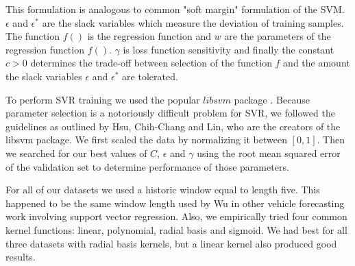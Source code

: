 This formulation  is analogous to common "soft margin" formulation of the SVM.   $\epsilon$ and $\epsilon^{*}$ are the slack variables which measure the deviation of training samples.  The function $f()$ is the regression function and $w$ are the parameters of the regression function $f()$.  $\gamma$ is loss function sensitivity and finally the constant $c > 0$ determines the trade-off between selection of the function $f$ and the amount the slack variables $\epsilon$ and $\epsilon^{*}$ are tolerated.  

To perform SVR training we used the popular $libsvm$ package \cite{Hsu2003}.  Because parameter selection is a notoriously difficult problem for SVR, we followed the guidelines as outlined by Hsu, Chih-Chang and Lin, who are the creators of the libsvm package.  We first scaled the data by normalizing it between $[0, 1]$.  Then we searched for our best values of $C$, $\epsilon$ and $\gamma$ using the root mean squared error of the validation set to determine performance of those parameters. 

For all of our datasets we used a historic window equal to length five.  This happened to be the same window length used by Wu \cite{Wu2004} in other vehicle forecasting work involving support vector regression.  Also, we empirically tried four common kernel functions: linear, polynomial, radial basis and sigmoid.  We had best for all three datasets with radial basis kernels, but a linear kernel also produced good results.
